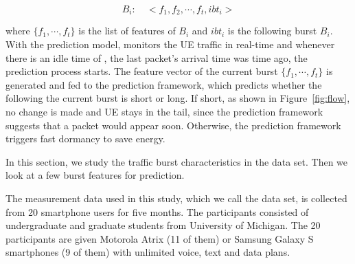 \begin{displaymath}
B_{i}:\quad <f_{1}, f_{2}, \cdots, f_{t}, ibt_{i}>
\end{displaymath}

where $\{f_{1}, \cdots, f_{t}\}$ is the list of features of $B_{i}$ and $ibt_{i}$ is the \IBT following burst $B_{i}$.
With the prediction model,  \NAME monitors the UE traffic in real-time and whenever there is an idle time of \BT, \ie the last packet's arrival time was \BT time ago, the prediction process starts. The feature vector of the current burst $\{f_{1}, \cdots, f_{t}\}$ is generated and fed to the prediction framework, which predicts whether the \IBT following the current burst is short or long. If short, as shown in Figure~\ref{fig:flow}, no change is made and UE stays in the tail, since the prediction framework suggests that a packet would appear soon. Otherwise, the prediction framework triggers fast dormancy to save energy.


\label{sec:stats}

In this section, we study the traffic burst characteristics in the \UMICH data set. Then we look at a few burst features for \IBT prediction.

\label{sec:data}
The measurement data used in this study, which we call the \UMICH data set, is collected from 20 smartphone users for five months. The participants consisted of undergraduate and graduate students from University of Michigan. The 20 participants are given Motorola Atrix (11 of them) or Samsung Galaxy S smartphones (9 of them) with unlimited voice, text and data plans.

